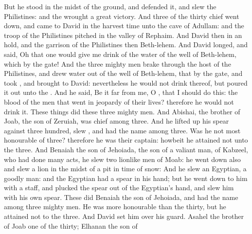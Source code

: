 {But he
stood in the
midst of the
ground, and
defended it, and
slew the
Philistines: and the
{}
wrought a
great
victory.
And
three of the
thirty
chief went
down, and
came to
David in the harvest
time unto the
cave of
Adullam: and the
troop of the
Philistines
pitched in the
valley of
Rephaim.
And
David
{} then in an
hold, and the
garrison of the
Philistines
{} then
{}
Beth-lehem.
And
David
longed, and
said, Oh that one would give me
drink of the
water of the
well of
Beth-lehem, which
{} by the
gate!
And the
three mighty
men brake
through the
host of the
Philistines, and
drew
water out of the
well of
Beth-lehem, that
{} by the
gate, and
took
{}, and
brought
{} to
David: nevertheless he
would not
drink thereof, but poured it
out unto the
{}.
And he
said, Be it
far from me, O
{}, that I should
do this:
{} the
blood of the
men that
went in jeopardy of their
lives? therefore he
would not
drink it. These things
did these
three mighty
men.
And
Abishai, the
brother of
Joab, the
son of
Zeruiah, was
chief among
three. And he lifted
up his
spear against
three
hundred,
{}
slew
{}, and had the
name among
three.
Was he not most
honourable of
three? therefore he was their
captain: howbeit he
attained not unto the
{}
three.
And
Benaiah the
son of
Jehoiada, the
son of a
valiant
man, of
Kabzeel, who had done
many
acts, he
slew
two lionlike
men of
Moab: he went
down also and
slew a
lion in the
midst of a
pit in
time of
snow:
And he
slew an
Egyptian, a
goodly
man: and the
Egyptian had a
spear in his
hand; but he went
down to him with a
staff, and
plucked the
spear out of the
Egyptian’s
hand, and
slew him with his own
spear.
These
{}
did
Benaiah the
son of
Jehoiada, and had the
name among
three mighty
men.
He was more
honourable than the
thirty, but he
attained not to the
{}
three. And
David
set him over his
guard.
Asahel the
brother of
Joab
{} one of the
thirty;
Elhanan the
son of
}

